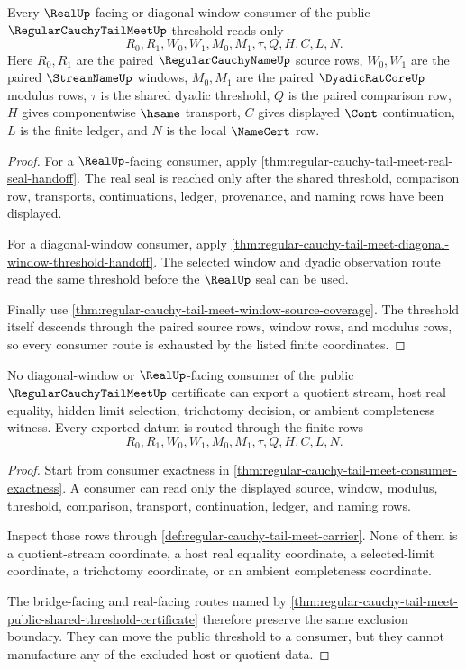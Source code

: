 \begin{theorem}
\label{thm:regular-cauchy-tail-meet-consumer-exactness}
Every $\RealUp$-facing or diagonal-window consumer of the public $\RegularCauchyTailMeetUp$ threshold reads only
$$
R_0,R_1,W_0,W_1,M_0,M_1,\tau,Q,H,C,L,N.
$$
Here $R_0,R_1$ are the paired $\RegularCauchyNameUp$ source rows, $W_0,W_1$ are the paired $\StreamNameUp$ windows, $M_0,M_1$ are the paired $\DyadicRatCoreUp$ modulus rows, $\tau$ is the shared dyadic threshold, $Q$ is the paired comparison row, $H$ gives componentwise $\hsame$ transport, $C$ gives displayed $\Cont$ continuation, $L$ is the finite ledger, and $N$ is the local $\NameCert$ row.
\end{theorem}
\begin{proof}
For a $\RealUp$-facing consumer, apply \autoref{thm:regular-cauchy-tail-meet-real-seal-handoff}. The real seal is reached only after the shared threshold, comparison row, transports, continuations, ledger, provenance, and naming rows have been displayed.

For a diagonal-window consumer, apply \autoref{thm:regular-cauchy-tail-meet-diagonal-window-threshold-handoff}. The selected window and dyadic observation route read the same threshold before the $\RealUp$ seal can be used.

Finally use \autoref{thm:regular-cauchy-tail-meet-window-source-coverage}. The threshold itself descends through the paired source rows, window rows, and modulus rows, so every consumer route is exhausted by the listed finite coordinates.
\end{proof}

\begin{theorem}
\label{thm:regular-cauchy-tail-meet-diagonal-consumer-nonescape}
No diagonal-window or $\RealUp$-facing consumer of the public $\RegularCauchyTailMeetUp$ certificate can export a quotient stream, host real equality, hidden limit selection, trichotomy decision, or ambient completeness witness. Every exported datum is routed through the finite rows
$$
R_0,R_1,W_0,W_1,M_0,M_1,\tau,Q,H,C,L,N.
$$
\end{theorem}
\begin{proof}
Start from consumer exactness in \autoref{thm:regular-cauchy-tail-meet-consumer-exactness}. A consumer can read only the displayed source, window, modulus, threshold, comparison, transport, continuation, ledger, and naming rows.

Inspect those rows through \autoref{def:regular-cauchy-tail-meet-carrier}. None of them is a quotient-stream coordinate, a host real equality coordinate, a selected-limit coordinate, a trichotomy coordinate, or an ambient completeness coordinate.

The bridge-facing and real-facing routes named by \autoref{thm:regular-cauchy-tail-meet-public-shared-threshold-certificate} therefore preserve the same exclusion boundary. They can move the public threshold to a consumer, but they cannot manufacture any of the excluded host or quotient data.
\end{proof}


